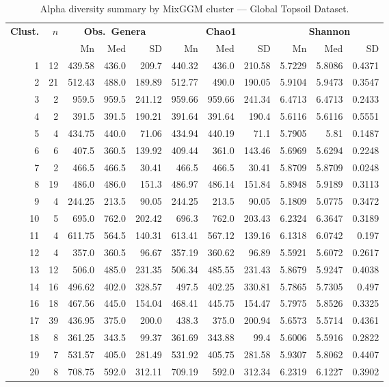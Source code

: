 \documentclass[12pt, oneside]{report}
\begin{document}
\begin{table}[H]
\centering
\caption[Alpha diversity by cluster --- Global Topsoil]{Alpha diversity summary by MixGGM cluster --- Global Topsoil Dataset.}
\label{tab:supp3a}
\small
\begin{tabular}{rr rrr rrr rrr}
\toprule
\textbf{Clust.} & \textbf{$n$} &
\multicolumn{3}{c}{\textbf{Obs.\ Genera}} &
\multicolumn{3}{c}{\textbf{Chao1}} &
\multicolumn{3}{c}{\textbf{Shannon}} \\
\cmidrule(lr){3-5}\cmidrule(lr){6-8}\cmidrule(lr){9-11}
& & Mn & Med & SD & Mn & Med & SD & Mn & Med & SD \\
\midrule
1 & 12 & 439.58 & 436.0 & 209.7 & 440.32 & 436.0 & 210.58 & 5.7229 & 5.8086 & 0.4371 \\
2 & 21 & 512.43 & 488.0 & 189.89 & 512.77 & 490.0 & 190.05 & 5.9104 & 5.9473 & 0.3547 \\
3 & 2 & 959.5 & 959.5 & 241.12 & 959.66 & 959.66 & 241.34 & 6.4713 & 6.4713 & 0.2433 \\
4 & 2 & 391.5 & 391.5 & 190.21 & 391.64 & 391.64 & 190.4 & 5.6116 & 5.6116 & 0.5551 \\
5 & 4 & 434.75 & 440.0 & 71.06 & 434.94 & 440.19 & 71.1 & 5.7905 & 5.81 & 0.1487 \\
6 & 6 & 407.5 & 360.5 & 139.92 & 409.44 & 361.0 & 143.46 & 5.6969 & 5.6294 & 0.2248 \\
7 & 2 & 466.5 & 466.5 & 30.41 & 466.5 & 466.5 & 30.41 & 5.8709 & 5.8709 & 0.0248 \\
8 & 19 & 486.0 & 486.0 & 151.3 & 486.97 & 486.14 & 151.84 & 5.8948 & 5.9189 & 0.3113 \\
9 & 4 & 244.25 & 213.5 & 90.05 & 244.25 & 213.5 & 90.05 & 5.1809 & 5.0775 & 0.3472 \\
10 & 5 & 695.0 & 762.0 & 202.42 & 696.3 & 762.0 & 203.43 & 6.2324 & 6.3647 & 0.3189 \\
11 & 4 & 611.75 & 564.5 & 140.31 & 613.41 & 567.12 & 139.16 & 6.1318 & 6.0742 & 0.197 \\
12 & 4 & 357.0 & 360.5 & 96.67 & 357.19 & 360.62 & 96.89 & 5.5921 & 5.6072 & 0.2617 \\
13 & 12 & 506.0 & 485.0 & 231.35 & 506.34 & 485.55 & 231.43 & 5.8679 & 5.9247 & 0.4038 \\
14 & 16 & 496.62 & 402.0 & 328.57 & 497.5 & 402.25 & 330.81 & 5.7865 & 5.7305 & 0.497 \\
16 & 18 & 467.56 & 445.0 & 154.04 & 468.41 & 445.75 & 154.47 & 5.7975 & 5.8526 & 0.3325 \\
17 & 39 & 436.95 & 375.0 & 200.0 & 438.3 & 375.0 & 200.94 & 5.6573 & 5.5714 & 0.4361 \\
18 & 8 & 361.25 & 343.5 & 99.37 & 361.69 & 343.88 & 99.4 & 5.6006 & 5.5916 & 0.2822 \\
19 & 7 & 531.57 & 405.0 & 281.49 & 531.92 & 405.75 & 281.58 & 5.9307 & 5.8062 & 0.4407 \\
20 & 8 & 708.75 & 592.0 & 312.11 & 709.19 & 592.0 & 312.34 & 6.2319 & 6.1227 & 0.3902 \\
\bottomrule
\end{tabular}
\end{table}
\end{document}
